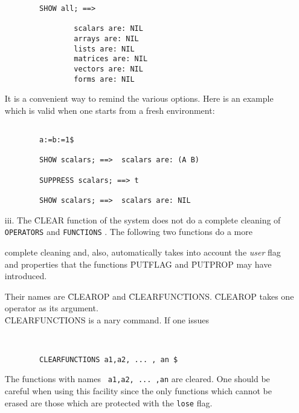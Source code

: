 \begin{itemize}
\begin{verbatim}
        SHOW all; ==>

                scalars are: NIL
                arrays are: NIL
                lists are: NIL
                matrices are: NIL
                vectors are: NIL
                forms are: NIL

\end{verbatim}
It is a convenient way to remind the various options. Here is an example
which is valid when one starts from a fresh environment:
\begin{verbatim}

        a:=b:=1$

        SHOW scalars; ==>  scalars are: (A B)

        SUPPRESS scalars; ==> t

        SHOW scalars; ==>  scalars are: NIL

\end{verbatim}
\item[iii.]
The \f{CLEAR} function of the system does not do a complete cleaning of
\verb+OPERATORS+ and \verb+FUNCTIONS+ . The following two functions do a more


complete cleaning and, also, automatically takes into account the
{\em user} flag and properties that the functions
\f{PUTFLAG} and \f{PUTPROP} may have introduced.


Their names are \f{CLEAROP} and \f{CLEARFUNCTIONS}.
\f{CLEAROP} takes one operator as its argument.\\
 \f{CLEARFUNCTIONS} is a nary command. If one issues


\begin{verbatim}


        CLEARFUNCTIONS a1,a2, ... , an $

\end{verbatim}
The functions with names \verb+ a1,a2, ... ,an+  are cleared.
One should be careful when  using this facility since the
only functions which cannot be erased are those which are
protected with the \verb+lose+ flag.
\end{itemize}
